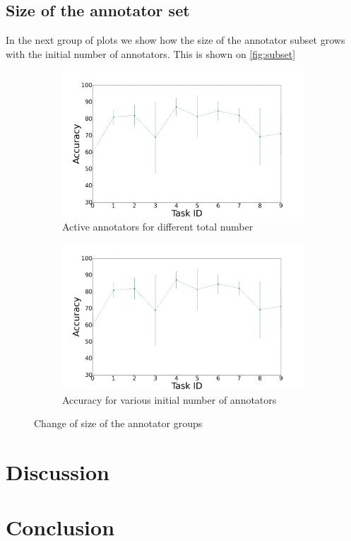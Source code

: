 \documentclass{llncs}
\begin{document}
\subsection{Size of the annotator set}

In the next group of plots we show how the size of the annotator subset grows with the initial number of annotators. This is shown on  \autoref{fig:subset}

\begin{figure}[!htb]
    \centering
    \begin{subfigure}[b]{0.45\textwidth}
        \includegraphics[width=\textwidth]{figures/plot_mlp}
        \caption{Active annotators for different total number}
    \end{subfigure}
    \begin{subfigure}[b]{0.45\textwidth}
        \includegraphics[width=\textwidth]{figures/plot_mlp}
        \caption{Accuracy for various initial number of annotators}
    \end{subfigure}
  \caption{Change of size of the annotator groups}
  \label{fig:subset}
\end{figure}




\section{Discussion}


\section{Conclusion}


 
\end{document}
